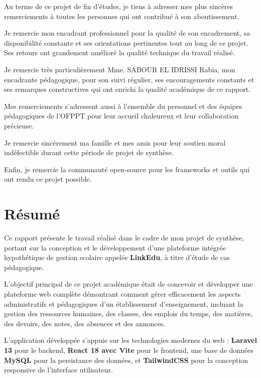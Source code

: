 \documentclass[12pt,a4paper]{report}
\begin{document}
    Au terme de ce projet de fin d'études, je tiens à adresser mes plus sincères remerciements à toutes les personnes qui ont contribué à son aboutissement.
    
    Je remercie mon encadrant professionnel pour la qualité de son encadrement, sa disponibilité constante et ses orientations pertinentes tout au long de ce projet. Ses retours ont grandement amélioré la qualité technique du travail réalisé.
    
    Je remercie très particulièrement Mme. SABOUR EL IDRISSI Rabia, mon encadrante pédagogique, pour son suivi régulier, ses encouragements constants et ses remarques constructives qui ont enrichi la qualité académique de ce rapport.
    
    Mes remerciements s'adressent aussi à l'ensemble du personnel et des équipes pédagogiques de l'OFPPT pour leur accueil chaleureux et leur collaboration précieuse.
    
    Je remercie sincèrement ma famille et mes amis pour leur soutien moral indéfectible durant cette période de projet de synthèse.
    
    Enfin, je remercie la communauté open-source pour les frameworks et outils qui ont rendu ce projet possible.


    \chapter*{Résumé}
    \setlength{\parskip}{3pt}
    \small

    Ce rapport présente le travail réalisé dans le cadre de mon projet de synthèse, portant sur la conception et le développement d'une plateforme intégrée hypothétique de gestion scolaire appelée \textbf{LinkEdu}, à titre d'étude de cas pédagogique.

    L'objectif principal de ce projet académique était de concevoir et développer une plateforme web complète démontrant comment gérer efficacement les aspects administratifs et pédagogiques d'un établissement d'enseignement, incluant la gestion des ressources humaines, des classes, des emplois du temps, des matières, des devoirs, des notes, des absences et des annonces.

    L'application développée s'appuie sur les technologies modernes du web : \textbf{Laravel 13} pour le backend, \textbf{React 18 avec Vite} pour le frontend, une base de données \textbf{MySQL} pour la persistance des données, et \textbf{TailwindCSS} pour la conception responsive de l'interface utilisateur.
\end{document}
